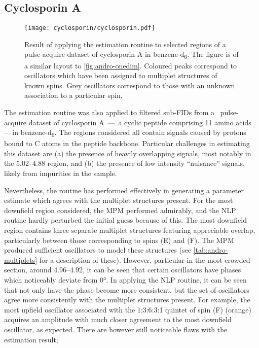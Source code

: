 
\subsection{Cyclosporin A}
\begin{figure}
    \texttt{[image: cyclosporin/cyclosporin.pdf]}
    \caption[
        Result of applying the estimation routine to selected regions of a
        pulse-acquire dataset of cyclosporin A.
    ]{
        Result of applying the estimation routine to selected regions of a
        pulse-acquire dataset of cyclosporin A in benzene-d\textsubscript{6}.
        The figure is of a similar layout to \cref{fig:andro-onedim}.
        Coloured peaks correspond to oscillators which have been assigned
        to multiplet structures of known spins. Grey oscillators correspond to
        those with an unknown association to a particular spin.
    }
    \label{fig:cyclosporin}
\end{figure}
The estimation routine was also applied to filtered sub-\acp{FID} from a
\proton\ pulse-acquire dataset of cyclosporin A \,---\, a cyclic peptide comprising 11 amino acids\,---\,in
benzene-d\textsubscript{6}. The regions considered all contain signals caused
by protons bound to C\textsuperscript{\textalpha} atoms in the peptide
backbone\cite{Verma2018}.
Particular challenges in estimating this dataset are (a) the presence of
heavily overlapping signals, most notably in the
\SIrange{5.02}{4.88}{\partspermillion} region, and (b) the presence of low
intensity ``nuisance'' signals, likely from impurities in the sample.

Nevertheless, the routine has performed effectively in generating a parameter
estimate which agrees with the multiplet structures present. For the most
downfield region considered, the \ac{MPM} performed admirably, and the \ac{NLP}
routine hardly perturbed the initial guess because of this.
The most downfield region contains three separate multiplet structures
featuring appreciable overlap, particularly between those corresponding to
spins (E) and (F). The \ac{MPM} produced sufficient oscillators to model these
structures (see \cref{tab:andro-multiplets} for a description of these).
However, particular in the most crowded section, around
\SIrange{4.96}{4.92}{\partspermillion}, it can be seen that certain oscillators
have phases which noticeably deviate from \ang{0}. In applying the \ac{NLP}
routine, it can be seen that not only have the phase become more consistent,
but the set of oscillators agree more consistently with the multiplet
structures present. For example, the most upfield oscillator associated with
the 1:3:6:3:1 quintet of spin (F) (orange) acquires an amplitude with much
closer agreement to the most downfield oscillator, as expected. There are however still noticeable flaws with the estimation result;
